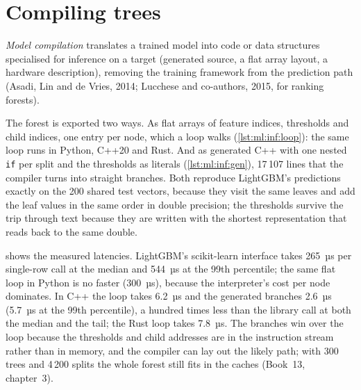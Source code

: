 \section{Compiling trees}

\begin{definition}\label{def:ml:low-latency-inference:compile}
\emph{Model compilation} translates a trained model into code or data structures specialised for
inference on a target (generated source, a flat array layout, a hardware description), removing the training framework from
the prediction path (Asadi, Lin and de Vries, 2014; Lucchese and co-authors, 2015, for ranking forests).
\end{definition}

The forest is exported two ways. As flat arrays of feature indices, thresholds and child indices, one entry per node, which a
loop walks (\cref{lst:ml:inf:loop}): the same loop runs in Python, C++20 and Rust. And as generated C++ with one nested
\texttt{if} per split and the thresholds as literals (\cref{lst:ml:inf:gen}), 17\,107 lines that the compiler turns into
straight branches. Both reproduce LightGBM's predictions exactly on the 200 shared test vectors, because they visit the same
leaves and add the leaf values in the same order in double precision; the thresholds survive the trip through text because
they are written with the shortest representation that reads back to the same double.

 shows the measured latencies. LightGBM's scikit-learn interface takes 265~µs per single-row call at
the median and 544~µs at the 99th percentile; the same flat loop in Python is no faster (300~µs), because the interpreter's
cost per node dominates. In C++ the loop takes 6.2~µs and the generated branches 2.6~µs (5.7~µs at the 99th percentile), a
hundred times less than the library call at both the median and the tail; the Rust loop takes 7.8~µs. The branches win over
the loop because the thresholds and child addresses are in the instruction stream rather than in memory, and the compiler
can lay out the likely path; with 300 trees and 4\,200 splits the whole forest still fits in the caches (Book~13, chapter~3).

